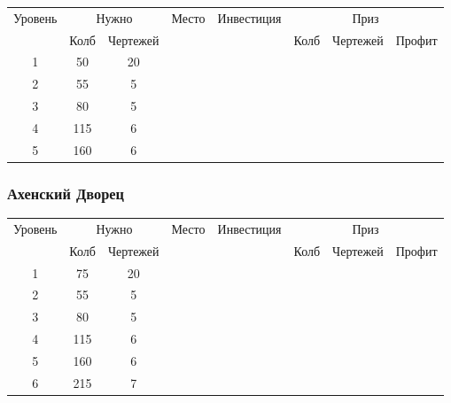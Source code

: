 \begin{longtable}[c]{|c|c|c|c|c|c|c|c|}
    \hline
    \multirow{ 2}{*}{\small Уровень} &
    \multicolumn{2}{|c|}{\small Нужно} &
    \multirow{ 2}{*}{\small Место} & 
    \multirow{ 2}{*}{\small Инвестиция} & 
    \multicolumn{3}{|c|}{\small Приз} \\\cline{2-3}\cline{6-8}
    &
    {\small Колб} & 
    {\small Чертежей} & 
    & &
    {\small Колб} & 
    {\small Чертежей} & 
    {\small Профит}
    \\\hline\endhead
    \multirow{1}{*}{1} & \multirow{1}{*}{50} & \multirow{1}{*}{20} & & & & & \\\hline
    \multirow{1}{*}{2} & \multirow{1}{*}{55} & \multirow{1}{*}{5} & & & & & \\\hline
    \multirow{1}{*}{3} & \multirow{1}{*}{80} & \multirow{1}{*}{5} & & & & & \\\hline
    \multirow{1}{*}{4} & \multirow{1}{*}{115} & \multirow{1}{*}{6} & & & & & \\\hline
    \multirow{1}{*}{5} & \multirow{1}{*}{160} & \multirow{1}{*}{6} & & & & & \\\hline
\end{longtable}


\subsubsection{Ахенский Дворец}

\begin{longtable}[c]{|c|c|c|c|c|c|c|c|}
    \hline
    \multirow{ 2}{*}{\small Уровень} &
    \multicolumn{2}{|c|}{\small Нужно} &
    \multirow{ 2}{*}{\small Место} & 
    \multirow{ 2}{*}{\small Инвестиция} & 
    \multicolumn{3}{|c|}{\small Приз} \\\cline{2-3}\cline{6-8}
    &
    {\small Колб} & 
    {\small Чертежей} & 
    & &
    {\small Колб} & 
    {\small Чертежей} & 
    {\small Профит}
    \\\hline\endhead
    \multirow{1}{*}{1} & \multirow{1}{*}{75} & \multirow{1}{*}{20} & & & & & \\\hline
    \multirow{1}{*}{2} & \multirow{1}{*}{55} & \multirow{1}{*}{5} & & & & & \\\hline
    \multirow{1}{*}{3} & \multirow{1}{*}{80} & \multirow{1}{*}{5} & & & & & \\\hline
    \multirow{1}{*}{4} & \multirow{1}{*}{115} & \multirow{1}{*}{6} & & & & & \\\hline
    \multirow{1}{*}{5} & \multirow{1}{*}{160} & \multirow{1}{*}{6} & & & & & \\\hline
    \multirow{1}{*}{6} & \multirow{1}{*}{215} & \multirow{1}{*}{7} & & & & & \\\hline
\end{longtable}
